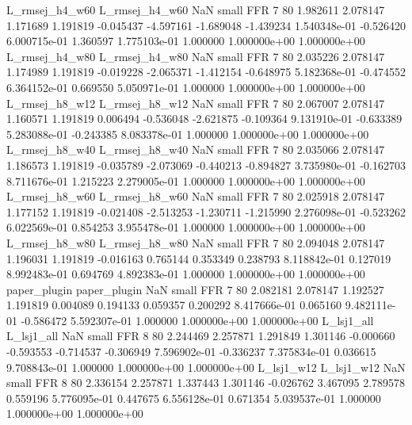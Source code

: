 L_rmsej_h4_w60 L_rmsej_h4_w60                   NaN      small      FFR                 7 80 1.982611       2.078147 1.171689       1.191819   -0.045437     -4.597161     -1.689048    -1.439234   1.540348e-01 -0.526420 6.000715e-01     1.360597   1.775103e-01            1.000000    1.000000e+00        1.000000e+00
L_rmsej_h4_w80 L_rmsej_h4_w80                   NaN      small      FFR                 7 80 2.035226       2.078147 1.174989       1.191819   -0.019228     -2.065371     -1.412154    -0.648975   5.182368e-01 -0.474552 6.364152e-01     0.669550   5.050971e-01            1.000000    1.000000e+00        1.000000e+00
L_rmsej_h8_w12 L_rmsej_h8_w12                   NaN      small      FFR                 7 80 2.067007       2.078147 1.160571       1.191819    0.006494     -0.536048     -2.621875    -0.109364   9.131910e-01 -0.633389 5.283088e-01    -0.243385   8.083378e-01            1.000000    1.000000e+00        1.000000e+00
L_rmsej_h8_w40 L_rmsej_h8_w40                   NaN      small      FFR                 7 80 2.035066       2.078147 1.186573       1.191819   -0.035789     -2.073069     -0.440213    -0.894827   3.735980e-01 -0.162703 8.711676e-01     1.215223   2.279005e-01            1.000000    1.000000e+00        1.000000e+00
L_rmsej_h8_w60 L_rmsej_h8_w60                   NaN      small      FFR                 7 80 2.025918       2.078147 1.177152       1.191819   -0.021408     -2.513253     -1.230711    -1.215990   2.276098e-01 -0.523262 6.022569e-01     0.854253   3.955478e-01            1.000000    1.000000e+00        1.000000e+00
L_rmsej_h8_w80 L_rmsej_h8_w80                   NaN      small      FFR                 7 80 2.094048       2.078147 1.196031       1.191819   -0.016163      0.765144      0.353349     0.238793   8.118842e-01  0.127019 8.992483e-01     0.694769   4.892383e-01            1.000000    1.000000e+00        1.000000e+00
  paper_plugin   paper_plugin                   NaN      small      FFR                 7 80 2.082181       2.078147 1.192527       1.191819    0.004089      0.194133      0.059357     0.200292   8.417666e-01  0.065160 9.482111e-01    -0.586472   5.592307e-01            1.000000    1.000000e+00        1.000000e+00
    L_lsj1_all     L_lsj1_all                   NaN      small      FFR                 8 80 2.244469       2.257871 1.291849       1.301146   -0.000660     -0.593553     -0.714537    -0.306949   7.596902e-01 -0.336237 7.375834e-01     0.036615   9.708843e-01            1.000000    1.000000e+00        1.000000e+00
    L_lsj1_w12     L_lsj1_w12                   NaN      small      FFR                 8 80 2.336154       2.257871 1.337443       1.301146   -0.026762      3.467095      2.789578     0.559196   5.776095e-01  0.447675 6.556128e-01     0.671354   5.039537e-01            1.000000    1.000000e+00        1.000000e+00
